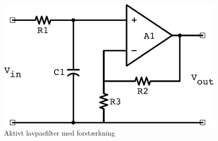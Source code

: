 \begin{figure}[H]
	\centering
	\includegraphics[resolution=300,scale=\diagramSize]{Figure/Introduktion/ActiveLowPassGain.pdf}
	\caption{Aktivt lavpasfilter med forstærkning}
	\label{fig:LowPassActiveGain}
\end{figure}
\noindent
{}
%
%
%
%
%
